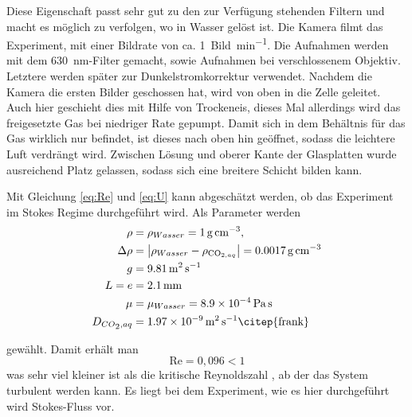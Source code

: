 
Diese Eigenschaft passt sehr gut zu den zur Verfügung stehenden Filtern und macht es möglich zu verfolgen, wo \COT in Wasser gelöst ist.
Die Kamera filmt das Experiment, mit einer Bildrate von ca. \SI{1}{Bild\per\minute}.  Die Aufnahmen werden mit dem \SI{630}{\nano\meter}-Filter gemacht, sowie Aufnahmen bei verschlossenem Objektiv. Letztere werden später zur Dunkelstromkorrektur verwendet.
Nachdem die Kamera die ersten Bilder geschossen hat, wird von oben \COT in die Zelle geleitet. Auch hier geschieht dies mit Hilfe von 
Trockeneis, dieses Mal allerdings wird das freigesetzte Gas bei niedriger Rate gepumpt. Damit sich in dem Behältnis für das Gas wirklich nur \COT befindet, ist dieses nach oben hin geöffnet, sodass die leichtere Luft verdrängt wird. Zwischen Lösung und oberer Kante der Glasplatten wurde ausreichend Platz gelassen, sodass sich eine breitere \COTm Schicht bilden kann.

Mit Gleichung \ref{eq:Re} und \ref{eq:U} kann abgeschätzt werden, ob das Experiment im Stokes Regime durchgeführt wird. Als Parameter werden 
\begin{align*}
  \rho &= \rho_{Wasser} = \SI{1}{\g\per\cubic\centi\meter}, \\ 
  \Delta\rho &= \left| \rho_{Wasser} - \rho_{\mathrm{CO}_{2, aq}} \right| = \SI[round-precision=4]{0,0017}{\gram\per\cubic\centi\meter} \\
  g &= \SI[round-precision=2]{9,81}{\meter\per\squared\second} \\
  L = e &= \SI[round-precision=1]{2,1}{\milli\meter} \\
  \mu &= \mu_{Wasser} = \SI{8,9e-4}{\pascal\second} \\
  D_{\COTn , aq} &= \SI[round-precision=2]{1,97e-9}{\meter\squared\per\second} \text{\citep{frank}}
\end{align*}

gewählt. Damit erhält man
\begin{equation}
 \mathrm{Re} = 0,096 < 1
\end{equation}
was sehr viel kleiner ist als die kritische Reynoldszahl , ab der das System turbulent werden kann. Es liegt bei dem Experiment, wie es hier durchgeführt wird Stokes-Fluss vor.

